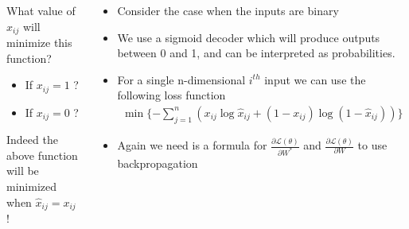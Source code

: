 \begin{frame}
    \small{
    \begin{columns}
        \begin{overlayarea}{\textwidth}{\textheight}
            \vspace{3pt}
            
            \vspace{-0.4cm}

            {
                What value of $\hat{x}_{ij}$ will minimize this function?
            }
            \vspace{-5pt}
            \begin{itemize}
                \item<6-> If $x_{ij} = 1$ ?
                \item<7-> If $x_{ij} = 0$ ?
            \end{itemize}
            {
                Indeed the above function will be minimized when $\hat{x}_{ij}=x_{ij}$ ! %
            }
        \end{overlayarea}

        \begin{overlayarea}{\textwidth}{\textheight}
        \vspace{0.2pt}
            \begin{itemize} 

                \item<2-> Consider the case when the inputs are binary
                \item <3-> We use a sigmoid decoder which will produce outputs between 0 and 1, and can be interpreted as probabilities.
                \item <4->For a single n-dimensional $i^{th}$ input we can use the following loss function
                \vspace{-0.1in}
                \begin{align*}
                \min \{ -\sum\limits_{j=1}^n(x_{ij}\log\hat{x}_{ij} + (1-x_{ij}) \log(1- \hat{x}_{ij})) \}
                \end{align*}
                \vspace{-0.2in}
                \item<8-> Again we need is a formula for $\frac{\partial \mathscr{L(\theta)}}{\partial W^*}$ and $\frac{\partial \mathscr{L(\theta)}}{\partial W}$ to use backpropagation 
            \end{itemize}
        \end{overlayarea}
    \end{columns}
    }
\end{frame}


